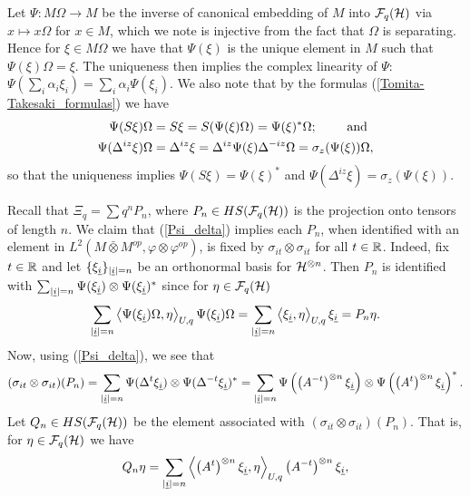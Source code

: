Let $\Psi\colon M\Omega\rightarrow M$ be the inverse of canonical embedding of $M$ into $\mathcal{F}_q(\mathcal H)$ via $x\mapsto x\Omega$ for $x\in M$, which we note is injective from the fact that $\Omega$ is separating. Hence for $\xi\in M\Omega$ we have that $\Psi(\xi)$ is the unique element in $M$ such that $\Psi(\xi)\Omega=\xi$. The uniqueness then implies the complex linearity of $\Psi$:  $\Psi(\sum_i \alpha_i\xi_i)=\sum_i \alpha_i\Psi(\xi_i)$. We also note that by the formulas (\ref{Tomita-Takesaki_formulas}) we have
	\begin{align}\label{Psi_delta}
		\Psi(S\xi)\Omega&=S\xi=S(\Psi(\xi)\Omega)=\Psi(\xi)^*\Omega;\qquad\text{ and}\notag\\
		\Psi(\Delta^{iz}\xi)\Omega &= \Delta^{iz}\xi = \Delta^{iz}\Psi(\xi)\Delta^{-iz}\Omega = \sigma_z(\Psi(\xi))\Omega,
	\end{align}
so that the uniqueness implies $\Psi(S\xi)=\Psi(\xi)^*$ and $\Psi(\Delta^{iz}\xi) = \sigma_z(\Psi(\xi))$.\par
Recall that $\Xi_q=\sum q^n P_n$, where $P_n\in HS(\mathcal{F}_q(\mathcal H))$ is the projection onto tensors of length $n$. We claim that (\ref{Psi_delta}) implies each $P_n$, when identified with an element in $L^2(M\bar{\otimes}M^{op},\varphi\otimes\varphi^{op})$, is fixed by $\sigma_{it}\otimes\sigma_{it}$ for all $t\in\mathbb{R}$. Indeed, fix $t\in\mathbb{R}$ and let $\{\xi_{\underline{i}}\}_{|\underline{i}|=n}$ be an orthonormal basis for $\mathcal H^{\otimes n}$. Then $P_n$ is identified with $\sum_{|\underline{i}|=n} \Psi(\xi_{\underline{i}})\otimes \Psi(\xi_{\underline{i}})^*$ since for $\eta\in\mathcal{F}_q(\mathcal H)$
	\begin{align*}
		\sum_{|\underline{i}|=n} \left\langle \Psi(\xi_{\underline{i}})\Omega, \eta\right\rangle_{U,q} \Psi(\xi_{\underline{i}})\Omega = \sum_{|\underline{i}|=n} \left\langle\xi_{\underline{i}},\eta\right\rangle_{U,q}\xi_{\underline{i}} = P_n\eta.
	\end{align*}
Now, using (\ref{Psi_delta}), we see that
	\begin{align*}
		(\sigma_{it}\otimes\sigma_{it})(P_n)= \sum_{|\underline{i}|=n} \Psi(\Delta^{t}\xi_{\underline{i}})\otimes \Psi(\Delta^{-t}\xi_{\underline{i}})^* = \sum_{|\underline{i}|=n} \Psi\left( \left(A^{-t}\right)^{\otimes n}\xi_{\underline{i}}\right) \otimes \Psi\left( \left( A^t\right)^{\otimes n}\xi_{\underline{i}}\right)^*.
	\end{align*}
Let $Q_n\in HS(\mathcal{F}_q(\mathcal H))$ be the element associated with $(\sigma_{it}\otimes\sigma_{it})(P_n)$. That is, for $\eta\in\mathcal{F}_q(\mathcal H)$ we have
	\begin{align*}
		Q_n\eta= \sum_{|\underline{i}|=n} \left\langle \left(A^{t}\right)^{\otimes n}\xi_{\underline{i}},\eta\right\rangle_{U,q} \left(A^{-t}\right)^{\otimes n}\xi_{\underline{i}},
	\end{align*}
